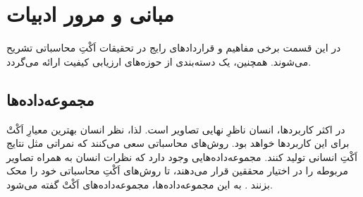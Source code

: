 \documentclass[twocolumn]{article}
\begin{document}
\section{مبانی و مرور ادبیات} \label{sec:review}
در این قسمت برخی مفاهیم و قرارداد‌های رایج در تحقیقات اَکْتِ محاسباتی تشریح می‌شوند. همچنین، یک دسته‌بندی از حوزه‌های ارزیابی کیفیت ارائه می‌گردد.
\subsection{مجموعه‌داده‌ها} \label{sec:datasets}
در اکثر کاربردها، انسان ناظرِ نهایی تصاویر است. لذا، نظر انسان بهترین معیارِ اَکْتْ برای این کاربردها خواهد بود. روش‌های محاسباتی سعی می‌کنند که نمراتی مثل نتایج اَکْتِ انسانی تولید کنند. مجموعه‌داده‌هایی وجود دارد که نظرات انسان به همراه تصاویر مربوطه را در اختیار محققین قرار می‌دهند، تا روش‌های اَکْتِ محاسباتی خود را محک بزنند \cite{mohammadi2014subjective}. به این مجموعه‌داده‌ها، مجموعه‌داده‌های اَکْتْ گفته می‌شود.
\end{document}

